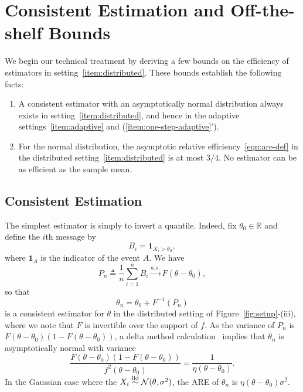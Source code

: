 \section{Consistent Estimation and Off-the-shelf Bounds \label{sec:preliminary}}

We begin our technical treatment by deriving a few
bounds on the efficiency of estimators in
setting~\eqref{item:distributed}. These bounds establish the
following facts:
\begin{enumerate}[1.]
\item A consistent estimator with an asymptotically normal distribution
  always exists in setting~\eqref{item:distributed}, and hence in the
  adaptive settings~\eqref{item:adaptive} and
  (\ref{item:one-step-adaptive}').
\item For the normal distribution, the asymptotic relative
  efficiency~\eqref{eqn:are-def} in the distributed
  setting~\eqref{item:distributed} is at most $3/4$. No estimator can be as
  efficient as the sample mean.
\end{enumerate}

\subsection{Consistent Estimation}
The simplest estimator is simply to invert a quantile. Indeed,
fix $\theta_0 \in \mathbb R$ and define the $i$th message by 
\[
B_i = \mathbf 1_{X_i>\theta_0}, 
\]
where $\mathbf 1_A$ is the indicator of the event $A$. We have
\[
P_n \triangleq\frac{1}{n} \sum_{i=1}^n B_i \overset{a.s.}{\rightarrow} F(\theta - \theta_0),  
\]
so that 
\begin{equation}
\label{eq:estimator_naive}
{\theta}_n = \theta_0 + F^{-1}\left( P_n \right)
\end{equation}
is a consistent estimator for $\theta$ in the distributed setting of
Figure~\ref{fig:setup}-(iii), where we note that $F$ is invertible over the
support of $f$. As the variance of $P_n$ is
$F(\theta-\theta_0)\left(1-F(\theta-\theta_0)\right)$, a delta method
calculation~\cite[Ch.~23]{VanDerVaart98} implies that ${\theta}_n$ is
asymptotically normal with variance
\begin{equation*}
  \frac{F(\theta-\theta_0)\left(1-F(\theta-\theta_0)\right)}{f^2(\theta-\theta_0)} = \frac{1}{
\eta(\theta-\theta_0)}.
\end{equation*}
In the Gaussian case where the $X_i \stackrel{\textup{iid}}{\sim} \mathcal{N}(\theta, \sigma^2)$, the
ARE of ${\theta}_n$ is $\eta(\theta - \theta_0)\sigma^2$.

